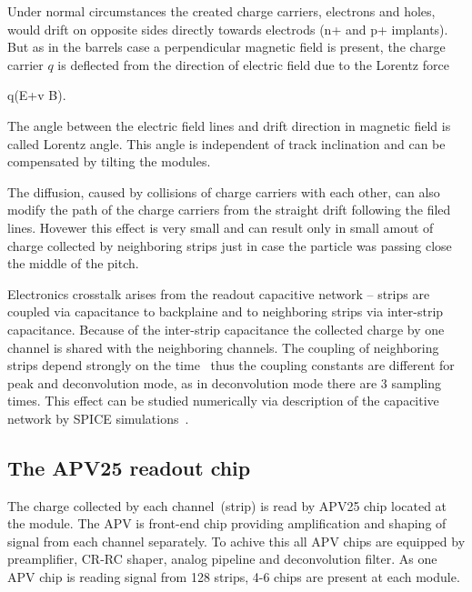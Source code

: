 Under normal circumstances the created charge carriers, electrons and holes, would drift on opposite sides directly towards electrods (n+ and p+ implants). But as in the barrels case a perpendicular magnetic field is present, the charge carrier $q$ is deflected from the direction of electric field due to the Lorentz force

{
    q(E+v \times B).
}

The angle between the electric field lines and drift direction in magnetic field is called Lorentz angle. This angle is independent of track inclination and can be compensated by tilting the modules.

The diffusion, caused by collisions of charge carriers with each other, can also modify the path of the charge carriers from the straight drift following the filed lines. Hovewer this effect is very small and can result only in small amout of charge collected by neighboring strips just in case the particle was passing close the middle of the pitch.


Electronics crosstalk arises from the readout capacitive network -- strips are coupled via capacitance to backplaine and to neighboring strips via inter-strip capacitance. Because of the inter-strip capacitance the collected charge by one channel is shared with the neighboring channels. The coupling of neighboring strips depend strongly on the time~\cite{Bloch:2007zza} thus the coupling constants are different for peak and deconvolution mode, as in deconvolution mode there are 3 sampling times. This effect can be studied numerically via description of the capacitive network by SPICE simulations~\cite{Barberis:1993ph}.




\subsection{The APV25 readout chip}

The charge collected by each channel~(strip) is read by APV25 chip located at the module. The APV is front-end chip providing amplification and shaping of signal from each channel separately. To achive this all APV chips are equipped by preamplifier, CR-RC shaper, analog pipeline and deconvolution filter. As one APV chip is reading signal from 128 strips, 4-6 chips are present at each module.


